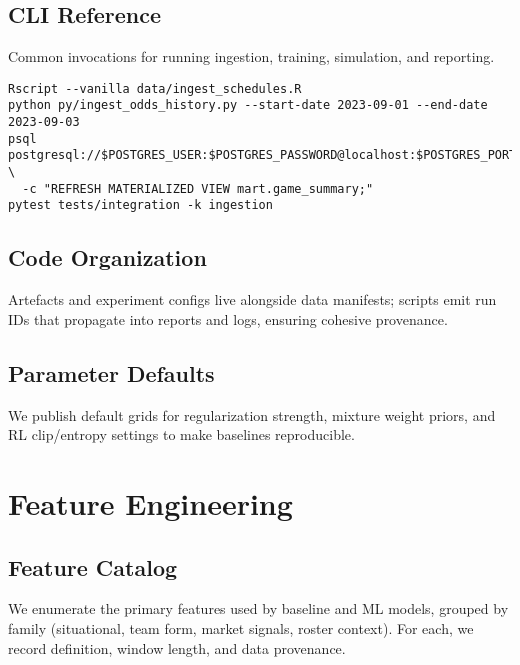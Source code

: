 \section{CLI Reference}\label{app:cli}
Common invocations for running ingestion, training, simulation, and reporting.
\begin{verbatim}
Rscript --vanilla data/ingest_schedules.R
python py/ingest_odds_history.py --start-date 2023-09-01 --end-date 2023-09-03
psql postgresql://$POSTGRES_USER:$POSTGRES_PASSWORD@localhost:$POSTGRES_PORT/$POSTGRES_DB \
  -c "REFRESH MATERIALIZED VIEW mart.game_summary;"
pytest tests/integration -k ingestion
\end{verbatim}

\section{Code Organization}\label{app:code-org}
Artefacts and experiment configs live alongside data manifests; scripts emit run IDs that propagate into reports and logs, ensuring cohesive provenance.

\section{Parameter Defaults}\label{app:parameters}
We publish default grids for regularization strength, mixture weight priors, and RL clip/entropy settings to make baselines reproducible.

\chapter{Feature Engineering}\label{app:features}


\section{Feature Catalog}\label{app:feature-catalog}
We enumerate the primary features used by baseline and ML models, grouped by family (situational, team form, market signals, roster context). For each, we record definition, window length, and data provenance.

